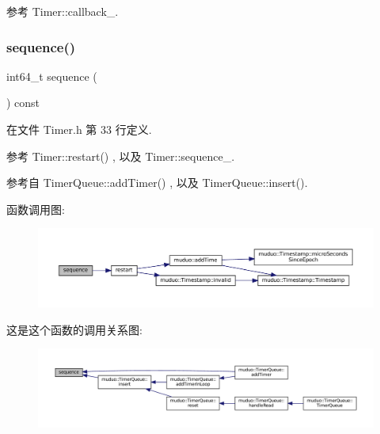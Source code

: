 参考 Timer\+::callback\+\_\+.

\mbox{\label{classmuduo_1_1Timer_a99f306fa27f00a90b51f028787651b30}} 
\subsubsection{\texorpdfstring{sequence()}{sequence()}}
{\footnotesize\ttfamily int64\+\_\+t sequence (\begin{DoxyParamCaption}{ }\end{DoxyParamCaption}) const\hspace{0.3cm}{\ttfamily [inline]}}



在文件 Timer.\+h 第 33 行定义.



参考 Timer\+::restart() , 以及 Timer\+::sequence\+\_\+.



参考自 Timer\+Queue\+::add\+Timer() , 以及 Timer\+Queue\+::insert().

函数调用图\+:
\nopagebreak
\begin{figure}[H]
\begin{center}
\leavevmode
\includegraphics[width=350pt]{classmuduo_1_1Timer_a99f306fa27f00a90b51f028787651b30_cgraph}
\end{center}
\end{figure}
这是这个函数的调用关系图\+:
\nopagebreak
\begin{figure}[H]
\begin{center}
\leavevmode
\includegraphics[width=350pt]{classmuduo_1_1Timer_a99f306fa27f00a90b51f028787651b30_icgraph}
\end{center}
\end{figure}


